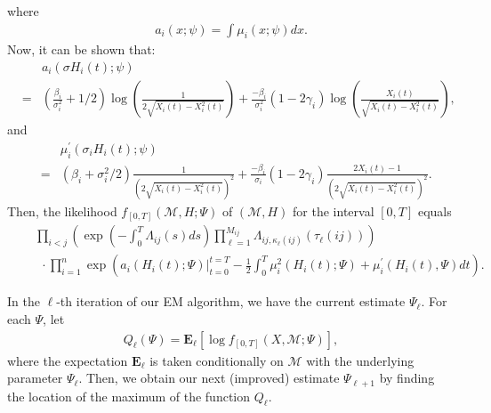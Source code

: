 \documentclass[12pt]{article}%
\begin{document}
where
\begin{eqnarray*}
a_i(x;\psi) = \int \mu_i(x;\psi) dx.
\end{eqnarray*}
Now, it can be shown that:
\begin{eqnarray*}
&\ &a_i(\sigma H_i(t);\psi)  \\
&= &
\left(\frac{\beta_i}{\sigma_i^2} + 1/2\right)
\log\left( \frac{1}{2\sqrt{X_i(t) - X_i^2(t)}} \right)
+
\frac{-\beta_i}{\sigma_i^2} (1-2\gamma_i)
\log\left( \frac{X_i(t)}{\sqrt{X_i(t) - X_i^2(t)}} \right),
\end{eqnarray*}
and
\begin{eqnarray*}
&\ & \mu_i^\prime(\sigma_i H_i(t);\psi) \\
&= &
\left(\beta_i + {\sigma_i^2}/2\right)
\frac{1}{\left(2\sqrt{X_i(t) - X_i^2(t)}\right)^2}
+
\frac{-\beta_i}{\sigma_i} (1-2\gamma_i)
\frac{2X_i(t)-1}{\left(2\sqrt{X_i(t) - X_i^2(t)}\right)^2}.
\end{eqnarray*}
Then, the likelihood $f_{[0,T]}(\mathcal M,H;\Psi)$ of $(\mathcal M,H)$ for the interval $[0,T]$ equals
\begin{eqnarray*}
&\ & \prod_{i<j} \left( \exp\left(-\int_0^{T} \Lambda_{ij}(s)ds\right) \prod_{\ell=1}^{M_{ij}}\Lambda_{ij,\kappa_\ell(ij)}(\tau_\ell(ij))\right)\\
&\ & \ \ \cdot
\prod_{i=1}^n \exp\left(
\left. a_i(H_i(t);\Psi) \right|_{t=0}^{t=T}-\frac{1}{2} \int_0^T \mu_i^2(H_i(t);\Psi) + \mu_i^\prime(H_i(t),\Psi) dt\right).
\end{eqnarray*}

In the $\ell$-th iteration of our EM algorithm, we have the current estimate $\Psi_\ell$.  For each $\Psi$, let
\begin{eqnarray}
Q_{\ell}(\Psi) = \mathbf E_{\ell}
\left[
\log f_{[0,T]}(X,\mathcal M;\Psi)
\right],
\end{eqnarray}
where the expectation $\mathbf E_\ell$ is taken conditionally on $\mathcal M$ with the underlying parameter $\Psi_\ell$. Then, we obtain our next (improved) estimate $\Psi_{\ell+1}$ by finding the location of the maximum of the function $Q_{\ell}$.
\end{document}
